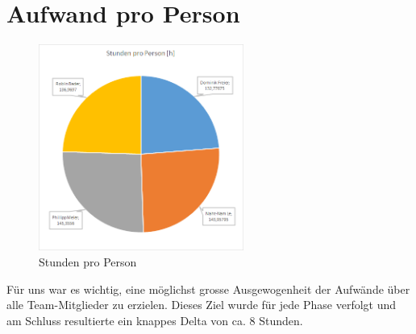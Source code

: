 	\section{Aufwand pro Person}
        \begin{figure}
            \vspace{-25pt}
            \begin{center}
                \includegraphics[width=0.6\textwidth]{content/schlussbericht/images/zeit_nach_person.png}
            \end{center}
            \vspace{-20pt}
            \caption{Stunden pro Person}
        \end{figure}
        Für uns war es wichtig, eine möglichst grosse Ausgewogenheit der Aufwände über alle Team-Mitglieder zu erzielen. Dieses Ziel wurde für jede Phase verfolgt und am Schluss resultierte ein knappes Delta von ca. 8 Stunden.
        \vspace{4cm}
	
    \newpage
